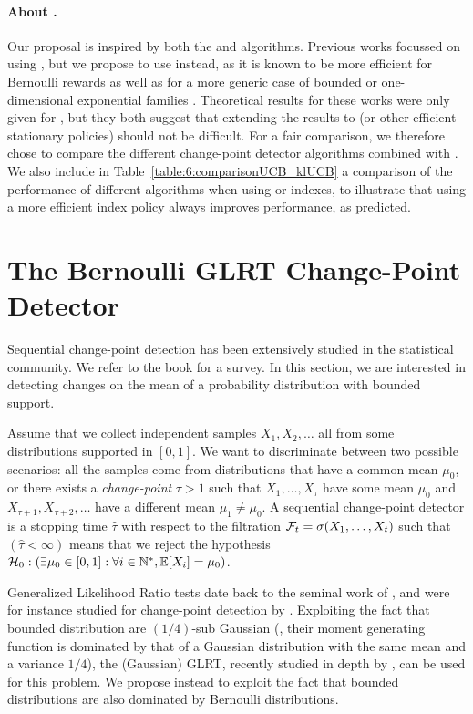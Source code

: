 \paragraph{About \klUCB.}
%
Our proposal \GLRklUCB{} is inspired by both the \MUCB{} and \CUSUMUCB{} algorithms.
Previous works focussed on using \UCB{} \cite{LiuLeeShroff17,CaoZhenKvetonXie18},
but we propose to use \klUCB{} instead, as it is known to be more efficient for Bernoulli rewards as well as for a more generic case of bounded or one-dimensional exponential families \cite{KLUCBJournal}.
Theoretical results for these works were only given for \UCB, but they both suggest that extending the results to \klUCB{} (or other efficient stationary policies) should not be difficult.
For a fair comparison, we therefore chose to compare the different change-point detector algorithms combined with \klUCB.
We also include in Table~\ref{table:6:comparisonUCB_klUCB} a comparison of the performance of different algorithms when using \UCB{} or \klUCB{} indexes, to illustrate that using a more efficient index policy always improves performance, as predicted.


\section{The Bernoulli GLRT Change-Point Detector}
\label{sec:6:ChangePointDetector}

Sequential change-point detection has been extensively studied in the statistical community.
We refer to the book \cite{Basseville93} for a survey.
%
In this section, we are interested in detecting changes on the mean of a probability distribution with bounded support.

Assume that we collect independent samples $X_1,X_2,\ldots$ all from some distributions supported in $[0,1]$.
We want to discriminate between two possible scenarios: all the samples come from distributions that have a common mean $\mu_0$, or there exists a \emph{change-point} $\tau > 1$ such that $X_1,\ldots,X_\tau$ have some mean $\mu_0$ and $X_{\tau +1},X_{\tau+2},\ldots$ have a different mean $\mu_1 \neq \mu_0$.
%
A sequential change-point detector is a stopping time $\widehat{\tau}$ with respect to the filtration $\mathcal{F}_t = \sigma(X_1,\dots,X_t)$ such that $(\hat \tau < \infty)$ means that we reject the hypothesis
$\mathcal{H}_0 : \left(\exists \mu_0 \in [0,1]: \forall i\in\mathbb{N}^*, \mathbb{E}[X_i] = \mu_0\right)$.

Generalized Likelihood Ratio tests date back to the seminal work of \cite{Wilks1938}, and were for instance studied for change-point detection by \cite{barnard1959control,siegmund1995using}.
Exploiting the fact that bounded distribution are $(1/4)$-sub Gaussian (\ie, their moment generating function is dominated by that of a Gaussian distribution with the same mean and a variance $1/4$), the (Gaussian) GLRT, recently studied in depth by \cite{Maillard2018GLR}, can be used for this problem.
We propose instead to exploit the fact that bounded distributions are also dominated by Bernoulli distributions.

